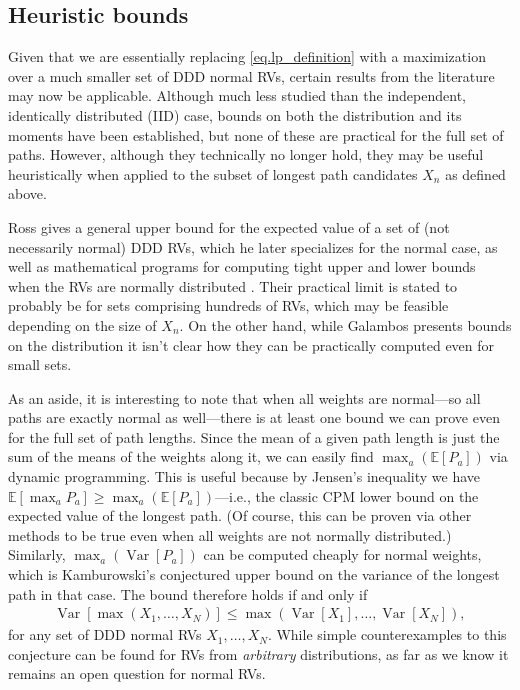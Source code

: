 \documentclass[12pt]{article}
\def\E{\mathbb{E}}
\def\Var{\operatorname{Var}}
\begin{document}
\subsection{Heuristic bounds}
\label{subsect.path_heuristic_bounds}

Given that we are essentially replacing \eqref{eq.lp_definition} with a maximization over a much smaller set of DDD normal RVs, certain results from the literature may now be applicable. Although much less studied than the independent, identically distributed (IID) case, bounds on both the distribution and its moments have been established, but none of these are practical for the full set of paths. However, although they technically no longer hold, they may be useful heuristically when applied to the subset of longest path candidates $X_n$ as defined above.

Ross gives a general upper bound for the expected value of a set of (not necessarily normal) DDD RVs, which he later specializes for the normal case, as well as mathematical programs for computing tight upper and lower bounds when the RVs are normally distributed \cite{ross03}. Their practical limit is stated to probably be for sets comprising hundreds of RVs, which may be feasible depending on the size of $X_n$. On the other hand, while Galambos \cite{gal72} presents bounds on the distribution it isn't clear how they can be practically computed even for small sets.

As an aside, it is interesting to note that when all weights are normal---so all paths are exactly normal as well---there is at least one bound we can prove even for the full set of path lengths. Since the mean of a given path length is just the sum of the means of the weights along it, we can easily find $\max_a(\E[P_a])$ via dynamic programming. This is useful because by Jensen's inequality we have  
  $\E[\max_aP_a] \geq \max_a(\E[P_a])$---i.e., the classic CPM lower bound on the expected value of the longest path. (Of course, this can be proven via other methods to be true even when all weights are not normally distributed.) Similarly, $\max_a(\Var[P_a])$ can be computed cheaply for normal weights, which is Kamburowski's conjectured upper bound on the variance of the longest path in that case. The bound therefore holds if and only if
  \begin{align*}
    \Var[\max(X_1, \dots, X_N)] \leq \max(\Var[X_1], \dots, \Var[X_N]),
  \end{align*}
  for any set of DDD normal RVs $X_1, \dots, X_N$. While simple counterexamples to this conjecture can be found for RVs from {\em arbitrary} distributions, as far as we know it remains an open question for normal RVs.
\end{document}
